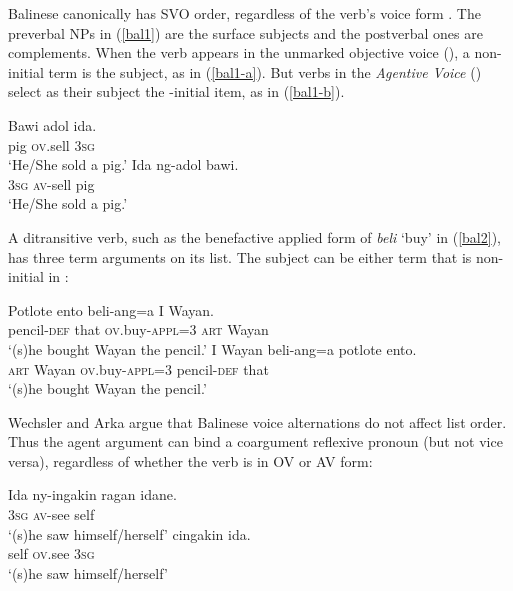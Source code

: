 \documentclass[output=paper
                ,modfonts
                ,nonflat
	        ,collection
	        ,collectionchapter
	        ,collectiontoclongg
 	        ,biblatex
                ,babelshorthands
                ,newtxmath
                ,draftmode
                ,colorlinks, citecolor=brown
]{./langsci/langscibook}
\begin{document}
 Balinese canonically has SVO order, regardless of the verb's voice form \citep{Artawa1994, Wechsler+Arka:1998}.  The preverbal NPs in  (\ref{bal1}) are the surface subjects and the postverbal ones are complements.  When the verb appears in the unmarked objective voice (), a non-initial term is the subject, as in (\ref{bal1-a}).    But verbs in the \emph{Agentive Voice} () select as their subject the \argst{}-initial item, as in (\ref{bal1-b}).  

\begin{exe}
	\ex\label{bal1}
\begin{xlist}
\ex \label{bal1-a}	\gll Bawi adol ida.  \\
		pig \textsc{ov}.sell \textsc{3sg}   \\
		\glt `He/She sold a pig.'
\ex	\label{bal1-b}\gll Ida ng-adol bawi.  \\
		\textsc{3sg} \textsc{av}-sell pig   \\
		\glt `He/She sold a pig.'
\end{xlist}
\end{exe} 

\noindent
A ditransitive verb,  such as the benefactive applied form of \textit{beli} `buy' in (\ref{bal2}), has three term arguments on its \argst list.  The subject can be either term that is non-initial in \argst{}:

\begin{exe}
	\ex\label{bal2}
\begin{xlist}
\ex 	\gll Potlote ento beli-ang=a I Wayan.  \\
		pencil-\textsc{def} that \textsc{ov}.buy-\textsc{appl}=3 \textsc{art} Wayan   \\
		\glt `(s)he bought Wayan the pencil.'
\ex 	\gll I Wayan beli-ang=a potlote ento.   \\
		\textsc{art} Wayan \textsc{ov}.buy-\textsc{appl}=3 pencil-\textsc{def} that   \\
		\glt `(s)he bought Wayan the pencil.'
\end{xlist}
\end{exe} 

\noindent
Wechsler and Arka argue that Balinese voice alternations  do not affect \argst list order. 
Thus the agent argument can bind a coargument reflexive pronoun (but not vice versa), regardless of whether the verb is in OV or AV form:

\begin{exe}
	\ex\label{bal3}
\begin{xlist}
\ex 	\gll Ida ny-ingakin ragan idane. \\
		\textsc{3sg} \textsc{av}-see self\\
		\glt ‘(s)he saw himself/herself’
\ex 	{} cingakin ida. \\
		self \textsc{ov}.see \textsc{3sg} \\
		\glt ‘(s)he saw himself/herself’
\end{xlist}
\end{exe} 
\end{document}
